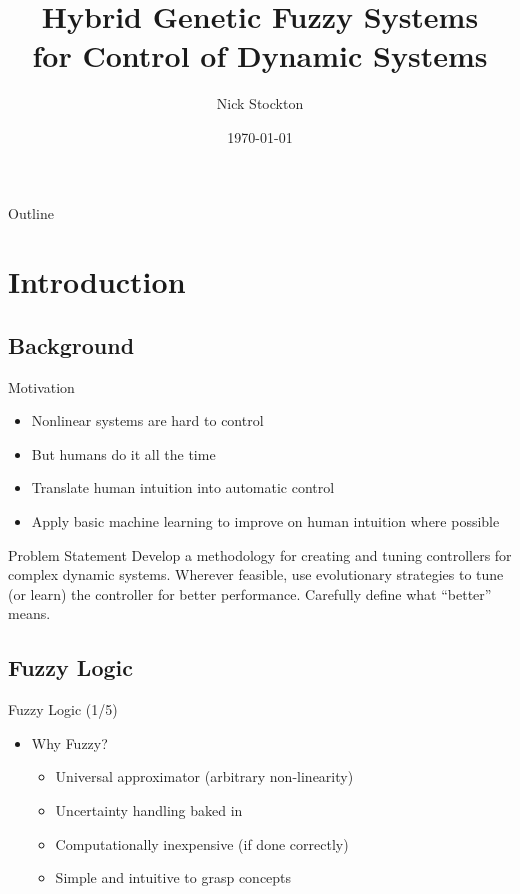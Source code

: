 \documentclass[]{beamer}
\author{Nick Stockton}
\title{Hybrid Genetic Fuzzy Systems\\for Control of Dynamic Systems}
\institute{College of Engineering and Applied Science}
\date{\today}
\begin{document}
\frame{\maketitle}
\addtocounter{framenumber}{-1}
\begin{frame}{Outline}
	\tableofcontents
\end{frame}

\section{Introduction}
\subsection{Background}

\begin{frame}{Motivation}
    \begin{itemize}
        \item Nonlinear systems are hard to control
        \item But humans do it all the time
        \item Translate human intuition into automatic control
        \item Apply basic machine learning to improve on human intuition where possible
    \end{itemize}
\end{frame}

\begin{frame}{Problem Statement}
        Develop a methodology for creating and tuning controllers for complex dynamic systems. Wherever
        feasible, use evolutionary strategies to tune (or learn) the controller for better performance.
        Carefully define what ``better'' means.
\end{frame}

\subsection{Fuzzy Logic}
\begin{frame}{Fuzzy Logic (1/5)}
\begin{itemize}
\item<+-> Why Fuzzy?
    \begin{itemize}
    \item<+-> Universal approximator (arbitrary non-linearity)
    \item<+-> Uncertainty handling baked in
    \item<+-> Computationally inexpensive (if done correctly)
    \item<+-> Simple and intuitive to grasp concepts
    \end{itemize}
\end{itemize}
\end{frame}
\end{document}
